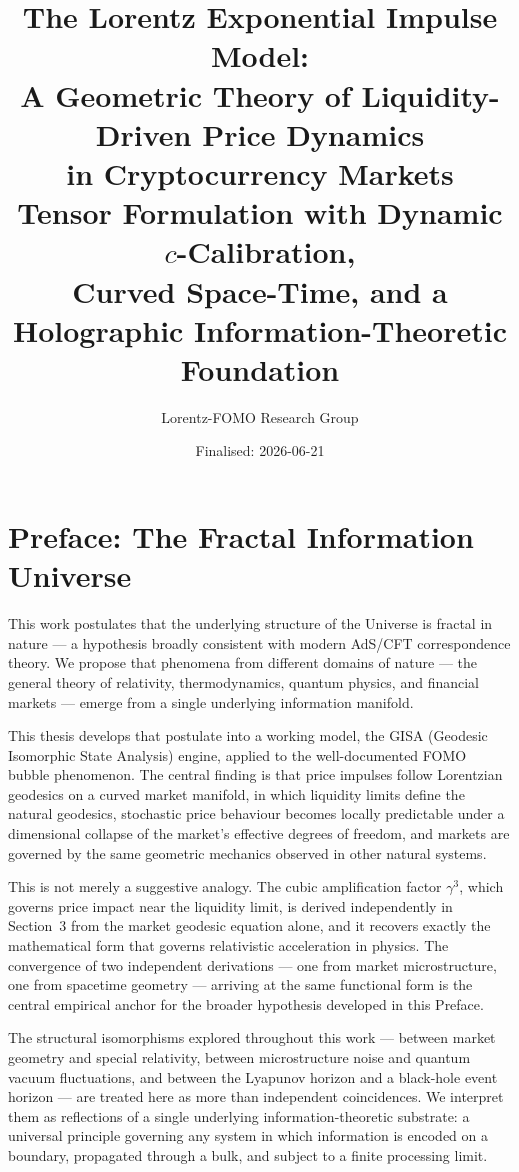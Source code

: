 \documentclass[12pt,a4paper]{article}
\title{The Lorentz Exponential Impulse Model:\\
A Geometric Theory of Liquidity-Driven Price Dynamics\\
in Cryptocurrency Markets\\[0.5em]
\large Tensor Formulation with Dynamic $c$-Calibration,\\
Curved Space-Time, and a Holographic Information-Theoretic Foundation}
\author{Lorentz-FOMO Research Group}
\date{Finalised: 2026-06-21}
\begin{document}
\maketitle


\section*{Preface: The Fractal Information Universe}

This work postulates that the underlying structure of the Universe is
fractal in nature --- a hypothesis broadly consistent with modern AdS/CFT
correspondence theory. We propose that phenomena from different domains of
nature --- the general theory of relativity, thermodynamics, quantum
physics, and financial markets --- emerge from a single underlying
information manifold.

This thesis develops that postulate into a working model, the GISA
(Geodesic Isomorphic State Analysis) engine, applied to the
well-documented FOMO bubble phenomenon. The central finding is that price
impulses follow Lorentzian geodesics on a curved market manifold, in which
liquidity limits define the natural geodesics, stochastic price behaviour
becomes locally predictable under a dimensional collapse of the market's
effective degrees of freedom, and markets are governed by the same
geometric mechanics observed in other natural systems.

This is not merely a suggestive analogy. The cubic amplification factor
$\gamma^3$, which governs price impact near the liquidity limit, is derived
independently in Section~3 from the market geodesic equation alone, and
it recovers exactly the mathematical form that governs relativistic
acceleration in physics. The convergence of two independent derivations
--- one from market microstructure, one from spacetime geometry ---
arriving at the same functional form is the central empirical anchor for
the broader hypothesis developed in this Preface.

The structural isomorphisms explored throughout this work --- between
market geometry and special relativity, between microstructure noise and
quantum vacuum fluctuations, and between the Lyapunov horizon and a
black-hole event horizon --- are treated here as more than independent
coincidences. We interpret them as reflections of a single underlying
information-theoretic substrate: a universal principle governing any
system in which information is encoded on a boundary, propagated through
a bulk, and subject to a finite processing limit.
\end{document}
